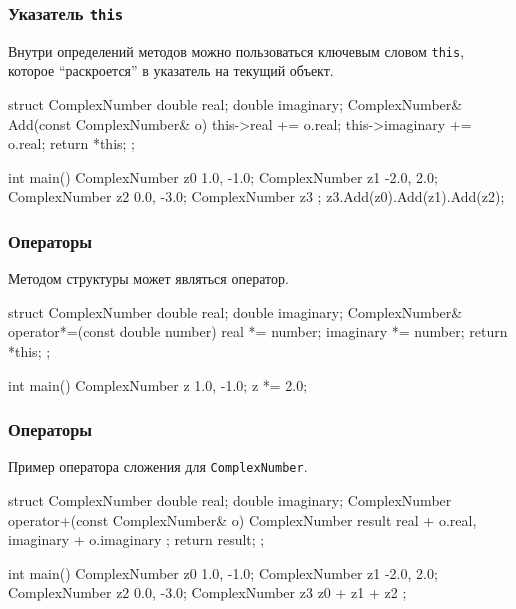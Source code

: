 \documentclass[compress, 8pt]{beamer}
\begin{document}
\begin{frame}[fragile]

    \frametitle{Указатель \texttt{this}}

    \hfill\break
    Внутри определений методов можно пользоваться ключевым словом
    \verb|this|\footnotemark{},
    которое \enquote{раскроется} в указатель на текущий объект.


    \begin{myinplacelisting}[minted language=cpp]
struct ComplexNumber {
    double real;
    double imaginary;
    ComplexNumber& Add(const ComplexNumber& o) {
        this->real += o.real;
        this->imaginary += o.real;
        return *this;
    }
};

int main() {
    ComplexNumber z0 {1.0, -1.0};
    ComplexNumber z1 {-2.0, 2.0};
    ComplexNumber z2 {0.0, -3.0};
    ComplexNumber z3 {};
    z3.Add(z0).Add(z1).Add(z2);
}
    \end{myinplacelisting}

\end{frame}

\begin{frame}[fragile]

    \frametitle{Операторы}

    Методом структуры может являться оператор.

    \begin{myinplacelisting}[minted language=cpp]
struct ComplexNumber {
    double real;
    double imaginary;
    ComplexNumber& operator*=(const double number) {
        real *= number;
        imaginary *= number;
        return *this;
    }
};

int main() {
    ComplexNumber z {1.0, -1.0};
    z *= 2.0;
}
    \end{myinplacelisting}

\end{frame}

\begin{frame}[fragile]

    \frametitle{Операторы}

    Пример оператора сложения для \verb|ComplexNumber|.

    \begin{myinplacelisting}[minted language=cpp]
struct ComplexNumber {
    double real;
    double imaginary;
    ComplexNumber operator+(const ComplexNumber& o) {
        ComplexNumber result {
            real + o.real,
            imaginary + o.imaginary
        };
        return result;
    }
};

int main() {
    ComplexNumber z0 {1.0, -1.0};
    ComplexNumber z1 {-2.0, 2.0};
    ComplexNumber z2 {0.0, -3.0};
    ComplexNumber z3 { z0 + z1 + z2 };
}
    \end{myinplacelisting}

\end{frame}
\end{document}
